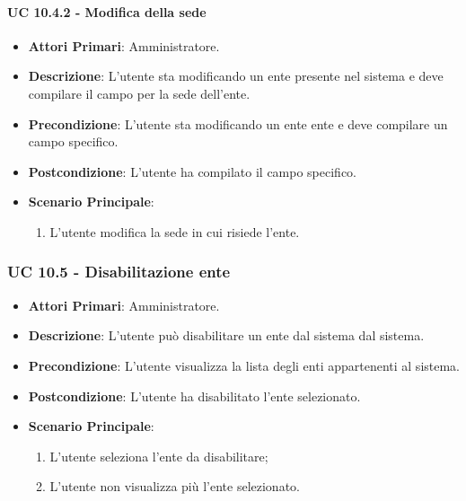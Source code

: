 			\paragraph{UC 10.4.2 - Modifica della sede}
			\begin{itemize}
				\item \textbf{Attori Primari}: Amministratore.
				\item \textbf{Descrizione}: L'utente sta modificando un ente presente nel sistema e deve compilare il campo per la sede dell'ente.
				\item \textbf{Precondizione}: L'utente sta modificando un ente ente e deve compilare un campo specifico.
				\item \textbf{Postcondizione}: L'utente ha compilato il campo specifico.
				\item \textbf{Scenario Principale}:
				\begin{enumerate}
					\item L'utente modifica la sede in cui risiede l'ente.
				\end{enumerate}	
			\end{itemize}	


			\subsubsection{UC 10.5 - Disabilitazione ente}
			\begin{itemize}
				\item \textbf{Attori Primari}: Amministratore.
				\item \textbf{Descrizione}: L'utente può disabilitare un ente dal sistema dal sistema.
				\item \textbf{Precondizione}: L'utente visualizza la lista degli enti appartenenti al sistema.
				\item \textbf{Postcondizione}: L'utente ha disabilitato l'ente selezionato.
				\item \textbf{Scenario Principale}:
				\begin{enumerate}
					\item{L'utente seleziona l'ente da disabilitare;}
					\item{L'utente non visualizza più l'ente selezionato.}
				\end{enumerate}	
			\end{itemize}	

